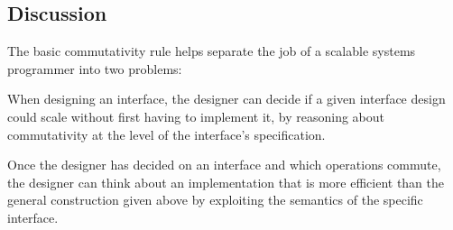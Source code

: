 \begin{comment}

\paragraph{Delayed allocation} You're designing an allocator.
It may run out of resources. You consider an interface design in which
the allocator returns an error indication if there are no free
resources. However, concurrent calls to the allocator therefor won't
commute, suggesting that there may not be a scalable implementation. You
think ``why not just have the allocator delay until resources become
available?'' With intuitive notions of commutativity, this appears to
make the allocator commutative, since there's no obvious difference
between a call when there were free resources and a call when there
weren't.
%
However, once you apply our careful definition of commutativity, you'll
realize that the delaying allocator doesn't make allocation commute.
Both the invocation and the response have to be in the re-interleaving
window. The definition says that every re-interleaving has to leave a legal
$R$. But you can't re-interleave the return of the allocation call that had
to wait so that it goes before the return of the allocation call that
didn't.
\end{comment}

\subsection{Discussion}

The basic commutativity rule helps separate the job of a scalable
systems programmer into
two problems:

\begin{CompactItemize}

\item When designing an interface, the designer can decide if a given
  interface design could scale without first having to implement it,
  by reasoning about commutativity at the level of the interface's
  specification.

\item Once the designer has decided on an interface and which operations
  commute, the designer can think about an implementation that is
  more efficient than the general construction given above by exploiting the
  semantics of the specific interface.

\end{CompactItemize}

